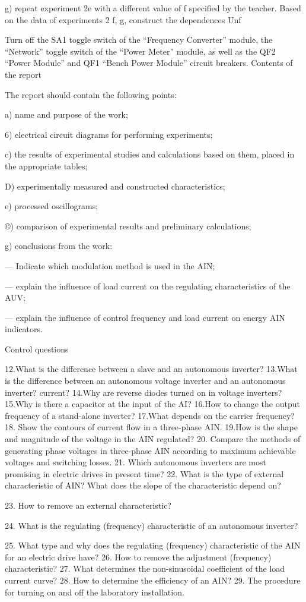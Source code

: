 \documentclass[a4paper,14pt]{article}
\begin{document}
g) repeat experiment 2e with a different value of f specified by the teacher. Based on the data of experiments 2 f, g, construct the dependences Unf


Turn off the SA1 toggle switch of the “Frequency Converter” module, the “Network” toggle switch of the “Power Meter” module, as well as the QF2 “Power Module” and QF1 “Bench Power Module” circuit breakers.
Contents of the report

The report should contain the following points:

a) name and purpose of the work;

6) electrical circuit diagrams for performing experiments;

c) the results of experimental studies and calculations based on them,
placed in the appropriate tables;

D) experimentally measured and constructed characteristics;

e) processed oscillograms;

©) comparison of experimental results and preliminary calculations;

g) conclusions from the work:

— Indicate which modulation method is used in the AIN;

— explain the influence of load current on the regulating characteristics of the AUV;

— explain the influence of control frequency and load current on energy
AIN indicators.

Control questions

12.What is the difference between a slave and an autonomous inverter?
13.What is the difference between an autonomous voltage inverter and an autonomous inverter?
current?
14.Why are reverse diodes turned on in voltage inverters?
15.Why is there a capacitor at the input of the AI?
16.How to change the output frequency of a stand-alone inverter?
17.What depends on the carrier frequency?
18. Show the contours of current flow in a three-phase AIN.
19.How is the shape and magnitude of the voltage in the AIN regulated?
20. Compare the methods of generating phase voltages in three-phase AIN according to
maximum achievable voltages and switching losses.
21. Which autonomous inverters are most promising in electric drives in
present time?
22. What is the type of external characteristic of AIN? What does the slope of the characteristic depend on?

23. How to remove an external characteristic?

24. What is the regulating (frequency) characteristic of an autonomous inverter?

25. What type and why does the regulating (frequency) characteristic of the AIN for an electric drive have?
26. How to remove the adjustment (frequency) characteristic?
27. What determines the non-sinusoidal coefficient of the load current curve?
28. How to determine the efficiency of an AIN?
29. The procedure for turning on and off the laboratory installation.
\end{document}
